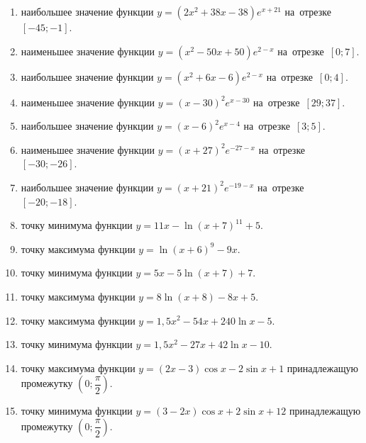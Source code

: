 \documentclass[a4paper,10pt]{article}
\begin{document}
\begin{enumerate}
\item {} наибольшее значение функции $y=\left(2x^2 +38x -38\right)e^{x+21}$ на~отрезке~$\left[-45;-1\right]$.

\item {} наименьшее значение функции $y=\left(x^2 -50x +50\right)e^{2-x}$ на~отрезке~$\left[0;7\right]$.

\item {} наибольшее значение функции $y=\left(x^2 +6x -6\right)e^{2-x}$ на~отрезке~$\left[0;4\right]$.

\item {} наименьшее значение функции $y=\left(x-30\right)^2e^{x-30}$ на~отрезке~$\left[29;37\right]$.

\item {} наибольшее значение функции $y=\left(x-6\right)^2e^{x-4}$ на~отрезке~$\left[3;5\right]$.

\item {} наименьшее значение функции $y=\left(x+27\right)^2e^{-27-x}$ на~отрезке~$\left[-30;-26\right]$.

\item {} наибольшее значение функции $y=\left(x+21\right)^2e^{-19-x}$ на~отрезке~$\left[-20;-18\right]$.

\item {} точку минимума функции $y=11x-\ln\left(x+7\right)^{11}+5$.

\item {} точку максимума функции $y=\ln\left(x+6\right)^{9}-9x$.

\item {} точку минимума функции $y=5x-5\ln\left(x+7\right)+7$.

\item {} точку максимума функции $y=8\ln\left(x+8\right)-8x+5$.

\item {} точку максимума функции $y=1,5x^2-54x+240\ln x -5$.

\item {} точку минимума функции $y=1,5x^2-27x+42\ln x -10$.

\item {} точку максимума функции $y=\left(2x-3\right)\cos x -2\sin x+1$
принадлежащую промежутку $\left(0;\dfrac{\pi}{2}\right)$.

\item {} точку минимума функции $y=\left(3-2x\right)\cos x +2\sin x+12$
принадлежащую промежутку $\left(0;\dfrac{\pi}{2}\right)$.


\end{enumerate}
\end{document}
